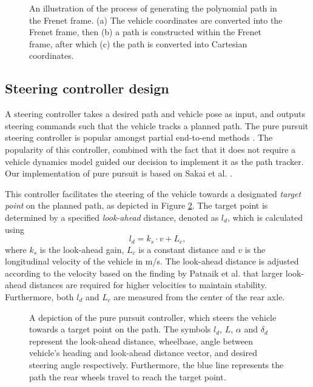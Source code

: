\begin{figure}[htb!]
    \centering
    
    \caption[Generating the path in the Frenet frame]{An illustration of the process of generating the polynomial path in the Frenet frame. (a) The vehicle coordinates are converted into the Frenet frame, then (b) a path is constructed within the Frenet frame, after which (c) the path is converted into Cartesian coordinates.}
    \label{fig:polynomial_path_generation}
\end{figure}


\subsection{Steering controller design}

A steering controller takes a desired path and vehicle pose as input, and outputs steering commands such that the vehicle tracks a planned path. 
The pure pursuit steering controller is popular amongst partial end-to-end methods \cite{Evans2021b, Weiss2020}.
The popularity of this controller, combined with the fact that it does not require a vehicle dynamics model guided our decision to implement it as the path tracker.
Our implementation of pure pursuit is based on Sakai et al. \cite{Sakai2018}.


This controller facilitates the steering of the vehicle towards a designated \emph{target point} on the planned path, as depicted in Figure \ref{fig:pure_pursuit}. 
The target point is determined by a specified \emph{look-ahead} distance, denoted as $l_d$, which is calculated using
\begin{equation}\label{eq:l_d}
    l_d = k_s \cdot v + L_{c},
\end{equation}
where $k_s$ is the look-ahead gain, $L_{c}$ is a constant distance and $v$ is the longitudinal velocity of the vehicle in m/s. 
The look-ahead distance is adjusted according to the velocity based on the finding by Patnaik et al. \cite{Patnaik2020} that larger look-ahead distances are required for higher velocities to maintain stability.
Furthermore, both $l_d$ and $L_c$ are measured from the center of the rear axle.

\begin{figure}[htb!]
    \centering
    
    \caption[A depiction of the pure pursuit controller]{A depiction of the pure pursuit controller, which steers the vehicle towards a target point on the path. The symbols $l_d$, $L$, $\alpha$ and $\delta_{d}$ represent the look-ahead distance, wheelbase, angle between vehicle's heading and look-ahead distance vector, and desired steering angle respectively. Furthermore, the blue line represents the path the rear wheels travel to reach the target point.}
    \label{fig:pure_pursuit}
\end{figure}

